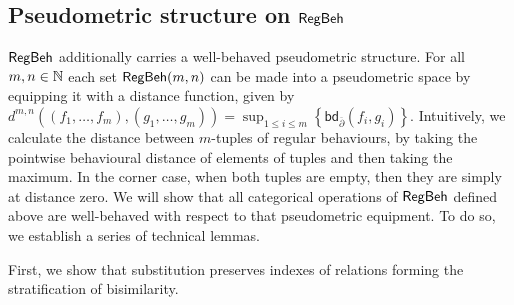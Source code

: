 \subsection{Pseudometric structure on $\mathsf{RegBeh}$}
$\mathsf{RegBeh}$ additionally carries a well-behaved pseudometric structure. For all $m,n \in \mathbb{N}$ each set $\mathsf{RegBeh}(m,n)$ can be made into a pseudometric space by equipping it with a distance function, given by $d^{m,n}((f_1, \dots, f_m), (g_1, \dots, g_m)) = \sup_{1 \leq i \leq m} \left\{ \mathsf{bd}_{\overline{\partial}}(f_i, g_i) \right\}$.
Intuitively, we calculate the distance between $m$-tuples of regular behaviours, by taking the pointwise behavioural distance of elements of tuples and then taking the maximum. In the corner case, when both tuples are empty, then they are simply at distance zero. We will show that all categorical operations of $\mathsf{RegBeh}$ defined above are well-behaved with respect to that pseudometric equipment. To do so, we establish a series of technical lemmas.

First, we show that substitution preserves indexes of relations forming the stratification of bisimilarity.

